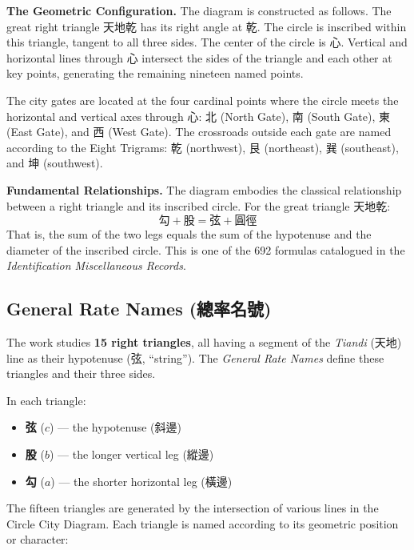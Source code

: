 \documentclass[11pt,a4paper]{article}
\begin{document}
\textbf{The Geometric Configuration.} The diagram is constructed as follows. The great right triangle 天地乾 has its right angle at 乾. The circle is inscribed within this triangle, tangent to all three sides. The center of the circle is 心. Vertical and horizontal lines through 心 intersect the sides of the triangle and each other at key points, generating the remaining nineteen named points.

The city gates are located at the four cardinal points where the circle meets the horizontal and vertical axes through 心: 北 (North Gate), 南 (South Gate), 東 (East Gate), and 西 (West Gate). The crossroads outside each gate are named according to the Eight Trigrams: 乾 (northwest), 艮 (northeast), 巽 (southeast), and 坤 (southwest).

\vspace{0.3cm}

\textbf{Fundamental Relationships.} The diagram embodies the classical relationship between a right triangle and its inscribed circle. For the great triangle 天地乾:
\[
\text{勾} + \text{股} = \text{弦} + \text{圓徑}
\]
That is, the sum of the two legs equals the sum of the hypotenuse and the diameter of the inscribed circle. This is one of the 692 formulas catalogued in the \textit{Identification Miscellaneous Records}.

\subsection{General Rate Names (總率名號)}
\label{subsec:names}

The work studies \textbf{15 right triangles}, all having a segment of the \textit{Tiandi} (天地) line as their hypotenuse (弦, ``string''). The \textit{General Rate Names} define these triangles and their three sides.

In each triangle:
\begin{itemize}[leftmargin=2em]
  \item \textbf{弦} ($c$) --- the hypotenuse (斜邊)
  \item \textbf{股} ($b$) --- the longer vertical leg (縱邊)
  \item \textbf{勾} ($a$) --- the shorter horizontal leg (橫邊)
\end{itemize}

\vspace{0.3cm}

The fifteen triangles are generated by the intersection of various lines in the Circle City Diagram. Each triangle is named according to its geometric position or character:
\end{document}
